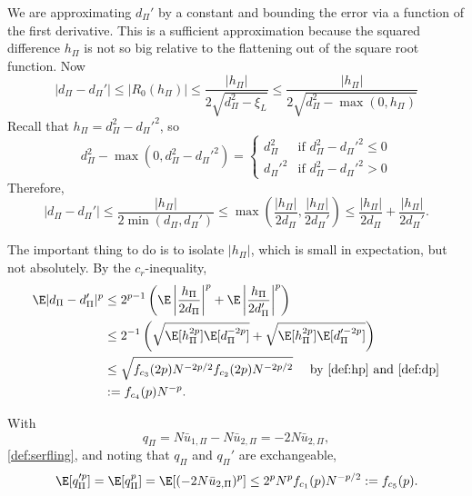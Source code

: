 We are approximating $d_{\Pi}'$ by a constant and bounding the error via a function of the first
derivative.  This is a sufficient approximation because the squared difference $h_{\Pi}$ is not so
big relative to the flattening out of the square root function.
Now
\begin{equation*}
  |d_{\Pi}-d_{\Pi}'| \leq |R_0(h_{\Pi})| \leq \frac{|h_{\Pi}|}{2\sqrt{d_{\Pi}^2-\xi_L}} \leq
  \frac{|h_{\Pi}|}{2\sqrt{d_{\Pi}^2-\max(0, h_{\Pi})}}
\end{equation*}
Recall that $h_{\Pi} = d_{\Pi}^2 - d_{\Pi}'^2$, so 
\begin{equation*}
  d_{\Pi}^2-\max(0, d_{\Pi}^2-d_{\Pi}'^2) = 
  \begin{cases}
    d_{\Pi}^2 & \text{if } d_{\Pi}^2-d_{\Pi}'^2 \leq 0 \\
    d_{\Pi}'^2 & \text{if } d_{\Pi}^2-d_{\Pi}'^2 > 0
  \end{cases}  
\end{equation*}
Therefore, 
\begin{equation*}
  |d_{\Pi}-d_{\Pi}'| \leq \frac{|h_{\Pi}|}{2\min(d_{\Pi}, d_{\Pi}')} \leq \max \left (
    \frac{|h_{\Pi}|}{2d_{\Pi}}, \frac{|h_{\Pi}|}{2d_{\Pi}'} \right ) \leq 
  \frac{|h_{\Pi}|}{2d_{\Pi}} +  \frac{|h_{\Pi}|}{2d_{\Pi}'}.
\end{equation*}

The important thing to do is to isolate $|h_{\Pi}|$, which is small in
expectation, but not absolutely.  By the $c_r$-inequality,
\begin{align}
  \E |d_{\Pi}-d_{\Pi}'|^p 
  &\leq 2^{p-1} \left ( \E \left | \frac{h_{\Pi}}{2d_{\Pi}} \right |^p + \E \left |
      \frac{h_{\Pi}}{2d_{\Pi}'} \right |^p \right ) \nonumber \\
  &\leq 2^{-1} \left ( \sqrt{\E[h_{\Pi}^{2p}]\E[d_{\Pi}^{-2p}]} +
  \sqrt{\E[h_{\Pi}^{2p}]\E[d_{\Pi}'^{-2p}]} \right ) \nonumber \\
  &\leq \sqrt{f_{c_3}(2p)N^{-2p/2} f_{c_2}(2p) N^{-2p/2}} \quad \text{ by } \eqref{def:hp}
  \text{ and } \eqref{def:dp} \nonumber \\
  &:= f_{c_4}(p) N^{-p} \label{def:ddiffp}.
\end{align}

With 
\begin{equation}
  \label{eq:qpi}
  q_{\Pi} = N\bar{u}_{1,\Pi} - N\bar{u}_{2,\Pi} = -2N\bar{u}_{2,\Pi},
\end{equation}
\eqref{def:serfling}, and noting that $q_{\Pi}$ and $q_{\Pi}'$ are exchangeable,
\begin{equation}
\label{def:qp}
  \E[q_{\Pi}'^p] = \E[q_{\Pi}^p] = \E[(-2N\bar{u}_{2,\Pi})^p]
  \leq 2^pN^p f_{c_1}(p)N^{-p/2} := f_{c_5}(p).
\end{equation}

